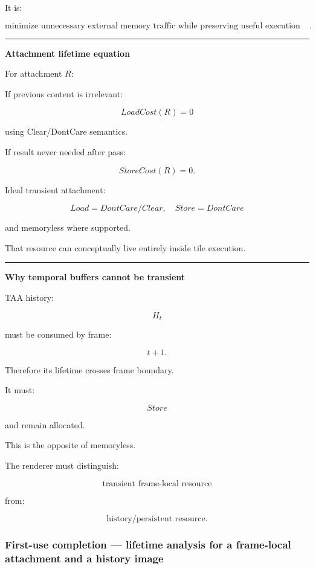 It is:

\[
\boxed{
\text{minimize unnecessary external memory traffic while preserving useful execution structure}.
}
\]

\begin{center}\rule{0.5\linewidth}{0.5pt}\end{center}

\textbf{Attachment lifetime equation}

For attachment \(R\):

If previous content is irrelevant:

\[
LoadCost(R)=0
\]

using Clear/DontCare semantics.

If result never needed after pass:

\[
StoreCost(R)=0.
\]

Ideal transient attachment:

\[
\boxed{
Load=DontCare/Clear
,\quad
Store=DontCare
}
\]

and memoryless where supported.

That resource can conceptually live entirely inside tile execution.

\begin{center}\rule{0.5\linewidth}{0.5pt}\end{center}

\textbf{Why temporal buffers cannot be transient}

TAA history:

\[
H_t
\]

must be consumed by frame:

\[
t+1.
\]

Therefore its lifetime crosses frame boundary.

It must:

\[
Store
\]

and remain allocated.

This is the opposite of memoryless.

The renderer must distinguish:

\[
\boxed{
\text{transient frame-local resource}
}
\]

from:

\[
\boxed{
\text{history/persistent resource}.
}
\]

\subsubsection{First-use completion --- lifetime analysis for a frame-local attachment and a history image}\label{01-foundations-i-ch016-first-use-completion-lifetime-analysis-for-a-frame-local-attachment-and-a-history-image}

